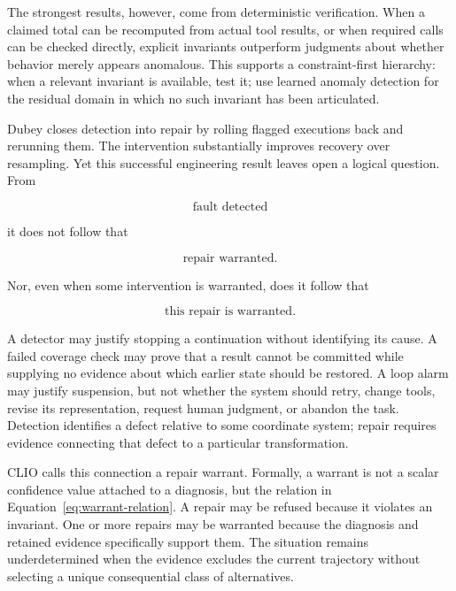 \documentclass[11pt]{article}
\begin{document}
The strongest results, however, come from deterministic verification. When a claimed total can be recomputed from actual tool results, or when required calls can be checked directly, explicit invariants outperform judgments about whether behavior merely appears anomalous. This supports a constraint-first hierarchy: when a relevant invariant is available, test it; use learned anomaly detection for the residual domain in which no such invariant has been articulated.

Dubey closes detection into repair by rolling flagged executions back and rerunning them. The intervention substantially improves recovery over resampling. Yet this successful engineering result leaves open a logical question. From

\begin{equation}
\text{fault detected}
\end{equation}

it does not follow that

\begin{equation}
\text{repair warranted}.
\end{equation}

Nor, even when some intervention is warranted, does it follow that

\begin{equation}
\text{this repair is warranted}.
\end{equation}

A detector may justify stopping a continuation without identifying its cause. A failed coverage check may prove that a result cannot be committed while supplying no evidence about which earlier state should be restored. A loop alarm may justify suspension, but not whether the system should retry, change tools, revise its representation, request human judgment, or abandon the task. Detection identifies a defect relative to some coordinate system; repair requires evidence connecting that defect to a particular transformation.

CLIO calls this connection a repair warrant. Formally, a warrant is not a scalar confidence value attached to a diagnosis, but the relation in Equation~\eqref{eq:warrant-relation}. A repair may be refused because it violates an invariant. One or more repairs may be warranted because the diagnosis and retained evidence specifically support them. The situation remains underdetermined when the evidence excludes the current trajectory without selecting a unique consequential class of alternatives.
\end{document}
